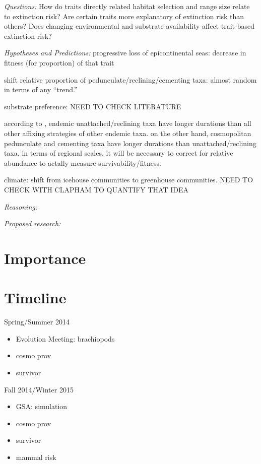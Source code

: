 \documentclass[12pt,letterpaper]{article}
\begin{document}
\textit{Questions:} How do traits directly related habitat selection and range size relate to extinction risk? Are certain traits more explanatory of extinction risk than others? Does changing environmental and substrate availability affect trait-based extinction risk?

\textit{Hypotheses and Predictions:}
progressive loss of epicontinental seas: decrease in fitness (for proportion) of that trait

shift relative proportion of pedunculate/reclining/cementing taxa: almost random \citep{Clapham2007} in terms of any ``trend.'' 

substrate preference: NEED TO CHECK LITERATURE

according to \citet{Alexander1977}, endemic unattached/reclining taxa have longer durations than all other affixing strategies of other endemic taxa. on the other hand, cosmopolitan pedunculate and cementing taxa have longer durations than unattached/reclining taxa. in terms of regional scales, it will be necessary to correct for relative abundance to actally measure survivability/fitness.

climate: shift from icehouse communities to greenhouse communities. NEED TO CHECK WITH CLAPHAM TO QUANTIFY THAT IDEA


\textit{Reasoning:}

\textit{Proposed research:}



\section{Importance}

\clearpage
\section{Timeline}

Spring/Summer 2014
\begin{itemize}
  \item Evolution Meeting: brachiopods
  \item cosmo prov
  \item survivor
\end{itemize}

Fall 2014/Winter 2015
\begin{itemize}
  \item GSA: simulation
  \item cosmo prov
  \item survivor
  \item mammal risk
\end{itemize}
\end{document}
